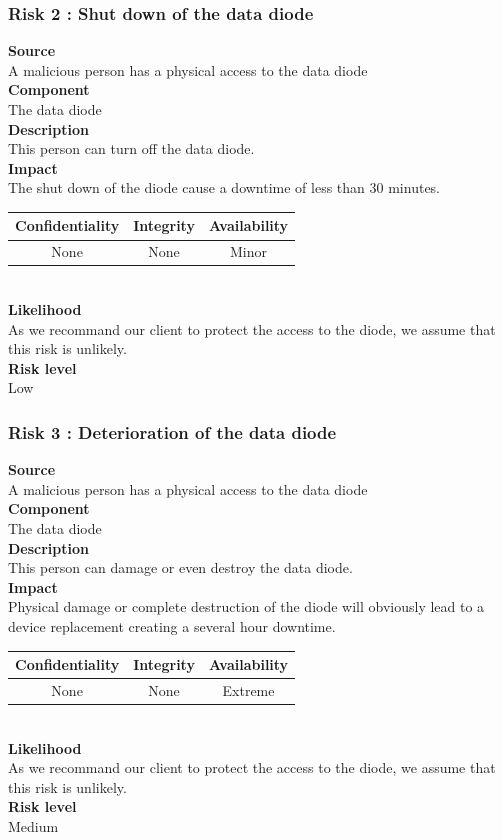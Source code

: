 \documentclass[a4paper,11pt]{article}
\begin{document}
\subsubsection{Risk 2 : Shut down of the data diode }
\textbf{Source} \\A malicious person has a physical access to the data diode\\
\textbf{Component} \\The data diode\\
\textbf{Description}\\ This person can turn off the data diode. \\
\textbf{Impact}\\
The shut down of the diode cause a downtime of less than 30 minutes.\\
\begin{tabular}{|c|c|c|}
\hline
Confidentiality & Integrity & Availability \\
\hline
None & None & Minor \\
\hline
\end{tabular}\\
\textbf{Likelihood}\\ As we recommand our client to protect the access to the diode, we assume that this risk is unlikely.\\
\textbf{Risk level}\\Low\\

\subsubsection{Risk 3 : Deterioration of the data diode }
\textbf{Source} \\A malicious person has a physical access to the data diode\\
\textbf{Component} \\The data diode\\
\textbf{Description}\\ This person can damage or even destroy the data diode.  \\
\textbf{Impact}\\
Physical damage or complete destruction of the diode will obviously lead to a device replacement creating a several hour downtime.\\
\begin{tabular}{|c|c|c|}
\hline
Confidentiality & Integrity & Availability \\
\hline
None & None & Extreme \\
\hline
\end{tabular}\\
\textbf{Likelihood}\\ As we recommand our client to protect the access to the diode, we assume that this risk is unlikely.\\
\textbf{Risk level}\\Medium\\
\end{document}
